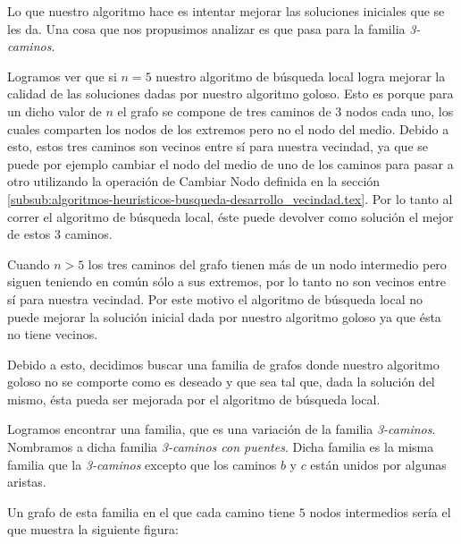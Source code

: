 Lo que nuestro algoritmo hace es intentar mejorar las soluciones iniciales que se les da. Una cosa que nos propusimos analizar es que pasa para la familia \emph{3-caminos}. 

Logramos ver que si $n = 5$ nuestro algoritmo de búsqueda local logra mejorar la calidad de las soluciones dadas por nuestro algoritmo goloso. Esto es porque para un dicho valor de $n$ el grafo se compone de tres caminos de $3$ nodos cada uno, los cuales comparten los nodos de los extremos pero no el nodo del medio. Debido a esto, estos tres caminos son vecinos entre sí para nuestra vecindad, ya que se puede por ejemplo cambiar el nodo del medio de uno de los caminos para pasar a otro utilizando la operación de Cambiar Nodo definida en la sección \ref{subsub:algoritmos-heuristicos-busqueda-desarrollo_vecindad.tex}. Por lo tanto al correr el algoritmo de búsqueda local, éste puede devolver como solución el mejor de estos $3$ caminos.

Cuando $n > 5$ los tres caminos del grafo tienen más de un nodo intermedio pero siguen teniendo en común sólo a sus extremos, por lo tanto no son vecinos entre sí para nuestra vecindad. Por este motivo el algoritmo de búsqueda local no puede mejorar la solución inicial dada por nuestro algoritmo goloso ya que ésta no tiene vecinos.

Debido a esto, decidimos buscar una familia de grafos donde nuestro algoritmo goloso no se comporte como es deseado y que sea tal que, dada la solución del mismo, ésta pueda ser mejorada por el algoritmo de búsqueda local.

Logramos encontrar una familia, que es una variación de la familia \emph{3-caminos}. Nombramos a dicha familia \emph{3-caminos con puentes}. Dicha familia es la misma familia que la \emph{3-caminos} excepto que los caminos $b$ y $c$ están unidos por algunas aristas.

Un grafo de esta familia en el que cada camino tiene $5$ nodos intermedios sería el que muestra la siguiente figura:

